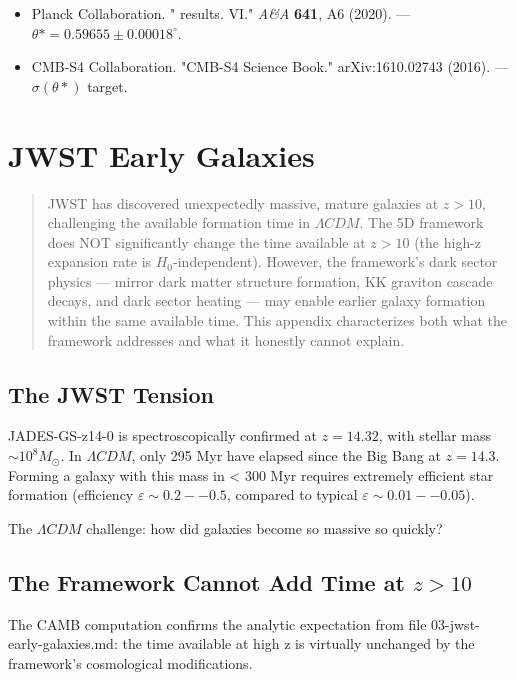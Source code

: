 \documentclass[aps,prd,preprint,superscriptaddress,longbibliography]{revtex4-2}
\begin{document}
\begin{itemize}
  \item Planck Collaboration. "\cite{Planck2018_VI} results. VI." \textit{A\&A} \textbf{641}, A6 (2020). --- $\theta* = 0.59655 \pm 0.00018^{\circ}$.
  \item CMB-S4 Collaboration. "CMB-S4 Science Book." arXiv:1610.02743 (2016). --- $\sigma(\theta*)$ target.
\end{itemize}


\section{JWST Early Galaxies}


\begin{quote}
JWST has discovered unexpectedly massive, mature galaxies at
$z > 10$, challenging the available formation time in $\Lambda CDM$.
The 5D framework does NOT significantly change the time available
at $z > 10$ (the high-z expansion rate is $H_{0}$-independent).
However, the framework's dark sector physics --- mirror dark matter
structure formation, KK graviton cascade decays, and dark sector
heating --- may enable earlier galaxy formation within the same
available time. This appendix characterizes both what the framework
addresses and what it honestly cannot explain.
\end{quote}



\subsection{The JWST Tension}

JADES-GS-z14-0 \cite{Carnianietal2024} is spectroscopically confirmed at $z = 14.32$, with stellar mass $\sim 10^{8} M_\odot$. In $\Lambda CDM$, only 295 Myr have elapsed since the Big Bang at $z = 14.3$. Forming a galaxy with this mass in < 300 Myr requires extremely efficient star formation (efficiency $\varepsilon \sim  0.2--0.5$, compared to typical $\varepsilon \sim  0.01--0.05$).

The $\Lambda CDM$ challenge: how did galaxies become so massive so quickly?



\subsection{The Framework Cannot Add Time at $z > 10$}

The CAMB computation confirms the analytic expectation from file 03-jwst-early-galaxies.md: the time available at high z is virtually unchanged by the framework's cosmological modifications.
\end{document}
